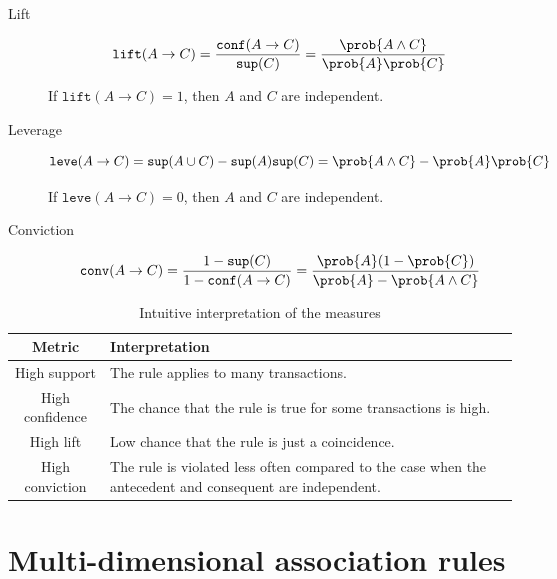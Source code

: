\begin{description}
    \item[Lift] 
        \[ \texttt{lift}(A \rightarrow C) = \frac{\texttt{conf}(A \rightarrow C)}{\texttt{sup}(C)} = \frac{\prob{A \land C}}{\prob{A}\prob{C}} \]

        If $\texttt{lift}(A \rightarrow C) = 1$, then $A$ and $C$ are independent.
    
    \item[Leverage] 
        \[ \texttt{leve}(A \rightarrow C) = \texttt{sup}(A \cup C) - \texttt{sup}(A)\texttt{sup}(C) = \prob{A \land C} - \prob{A}\prob{C} \]
        
        If $\texttt{leve}(A \rightarrow C) = 0$, then $A$ and $C$ are independent.
    
    \item[Conviction] 
        \[ \texttt{conv}(A \rightarrow C) = \frac{1 - \texttt{sup}(C)}{1 - \texttt{conf}(A \rightarrow C)} = \frac{\prob{A}(1-\prob{C})}{\prob{A}-\prob{A \land C}} \]
\end{description}

\begin{table}[H]
    \centering
    \begin{tabular}{c|p{10cm}}
        \hline
        \textbf{Metric} & \textbf{Interpretation} \\
        \hline
        High support        & The rule applies to many transactions. \\
        \hline
        High confidence     & The chance that the rule is true for some transactions is high. \\
        \hline
        High lift           & Low chance that the rule is just a coincidence. \\
        \hline
        High conviction     & The rule is violated less often compared to the case when the antecedent and consequent are independent. \\
        \hline
    \end{tabular}
    \caption{Intuitive interpretation of the measures}
\end{table}



\section{Multi-dimensional association rules}

